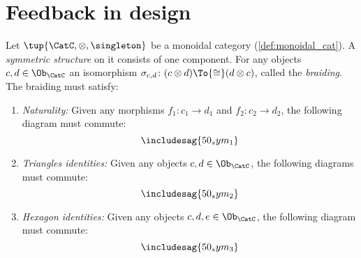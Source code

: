 \section{Feedback in design}
\begin{shaded}
\begin{definition}
Let $\tup{\CatC,\otimes,\singleton}$ be a monoidal category (\cref{def:monoidal_cat}). A \emph{symmetric structure} on it consists of one component. For any objects $c,d\in\Ob_\CatC$ an isomorphism $\sigma_{c,d}\colon (c\otimes d)\To{\cong}(d\otimes c)$, called the \emph{braiding}. The braiding must satisfy:
\begin{enumerate}
	\item \emph{Naturality:} Given any morphisms $f_1\colon c_1\to d_1$ and $f_2\colon c_2\to d_2$, the following diagram must commute:
	\begin{equation}
	\includesag{50_sym_1}
	\end{equation}
	\item \emph{Triangles identities:} Given any objects $c,d\in\Ob_\CatC$, the following diagrams must commute:
\begin{equation}
	\includesag{50_sym_2}
\end{equation}
\item \emph{Hexagon identities:} Given any objects $c,d,e\in \Ob_\CatC$, the following diagram must commute:
\begin{equation}
    \includesag{50_sym_3}
\end{equation}
\end{enumerate}
\end{definition}


\end{shaded}
